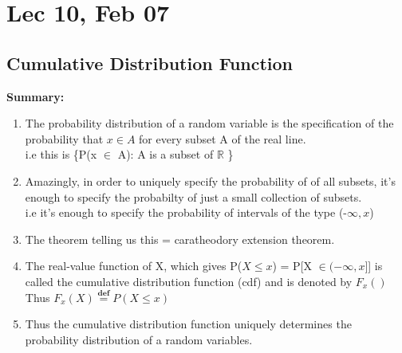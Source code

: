\documentclass[11pt]{article}
\begin{document}
    \section{Lec 10, Feb 07}
        \subsection{Cumulative Distribution Function}
            \textbf{Summary: }
            \begin{enumerate}
                \item The probability distribution of a random variable 
                        is the specification of the probability that $x \in A$ for every subset A of the real line.\\ 
                        i.e this is \{P(x $\in$ A): A is a subset of $\mathbb{R}$ \}
                \item Amazingly, in order to uniquely specify the probability of of all subsets, 
                        it's enough to specify the probabilty of just a small collection of subsets.\\
                        i.e it's enough to specify the probability of intervals of the type (-$\infty, x$)
                \item The theorem telling us this = caratheodory extension theorem.
                \item The real-value function of X, which gives P($X \leq x$) = P[X $\in (-\infty,x]$] is called the cumulative distribution function (cdf) and is denoted by $F_x()$
                        Thus $F_x(X) \stackrel{\textbf{def}}{=} P(X \leq x)$
                \item Thus the cumulative distribution function uniquely determines the probability distribution of a random variables.
            \end{enumerate}
\end{document}
